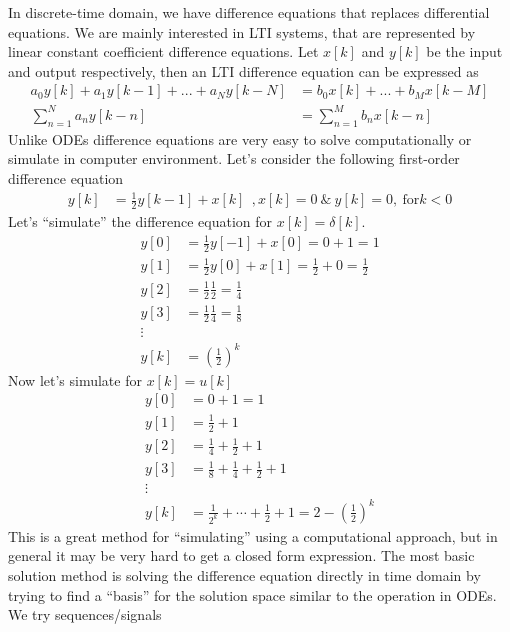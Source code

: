 \documentclass[twoside]{article}
\begin{document}
In discrete-time domain, we have difference equations that replaces
differential equations. We are mainly interested in LTI systems, that
are represented by linear constant coefficient 
difference equations. Let $x[k]$ and $y[k]$ be the input and output
respectively, then an LTI difference equation can be expressed as 
%
\begin{align*}
a_0  y[k] + a_{1}  y[k-1] + ... + a_N y[k-N] &= b_{0}  x[k] + ... +
                                               b_M x[k-M] \\
\sum\limits_{n=1}^{N} a_n y[k - n] &= \sum\limits_{n=1}^{M} b_n x[k - n]
\end{align*}
%
Unlike ODEs difference equations are very easy to solve
computationally or simulate in computer environment. 
Let's consider the following first-order difference equation
%
\begin{align*}
y[k] &= \frac{1}{2} y[k-1] + x[k] \ \ , x[k] = 0 \ \& \ y[k] = 0 , \
       \mathrm{for} k < 0 
\end{align*}
%
Let's ``simulate'' the difference equation for $x[k] = \delta[k]$.
%
\begin{align*}
y[0] &= \frac{1}{2} y[-1] + x[0] = 0 + 1 = 1\\
y[1] &= \frac{1}{2} y[0] + x[1] = \frac{1}{2} + 0 = \frac{1}{2} \\
y[2] &= \frac{1}{2} \frac{1}{2} = \frac{1}{4}  \\
y[3] &= \frac{1}{2} \frac{1}{4} = \frac{1}{8} \\
\vdots \\
y[k] &= \left( \frac{1}{2} \right)^k
\end{align*}
%
Now let's simulate for $x[k] = u[k]$
%
\begin{align*}
y[0] &=  0 + 1 = 1\\
y[1] &= \frac{1}{2} + 1 \\
y[2] &= \frac{1}{4} + \frac{1}{2} + 1 \\
y[3] &= \frac{1}{8} + \frac{1}{4} + \frac{1}{2}  + 1 \\
\vdots \\
y[k] &= \frac{1}{2^k} + \cdots + \frac{1}{2}  + 1 = 2 -  \left( \frac{1}{2} \right)^k
\end{align*}
%
This is a great method for ``simulating'' using a computational
approach, but in general it may be very hard to get a closed 
form expression.
%
The most basic solution method is solving the difference equation
directly in time domain by trying to find a ``basis'' for the solution
space similar to the operation in ODEs. We try sequences/signals
\end{document}
